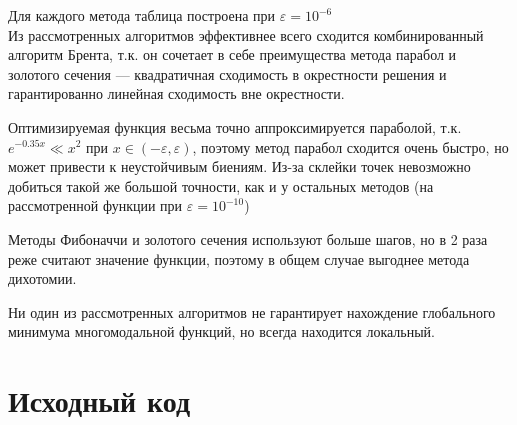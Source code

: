 \begin{center}
\end{center}

Для каждого метода таблица построена при $\varepsilon = 10^{-6}$\\

Из рассмотренных алгоритмов эффективнее всего сходится комбинированный алгоритм Брента, т.к. он сочетает в себе преимущества метода парабол и золотого сечения --- квадратичная сходимость в окрестности решения и гарантированно линейная сходимость вне окрестности. 

Оптимизируемая функция весьма точно аппроксимируется параболой, т.к. \(e^{ - 0.35 x} \ll x^2\) при \(x\in( - \varepsilon, \varepsilon)\), поэтому метод парабол сходится очень быстро, но может привести к неустойчивым биениям. Из-за склейки точек невозможно добиться такой же большой точности, как и у остальных методов (на рассмотренной функции при \(\varepsilon = 10^{-10}\))

Методы Фибоначчи и золотого сечения используют больше шагов, но в 2 раза реже считают значение функции, поэтому в общем случае выгоднее метода дихотомии.

Ни один из рассмотренных алгоритмов не гарантирует нахождение глобального минимума многомодальной функций, но всегда находится локальный.

\newpage
\section{Исходный код}

